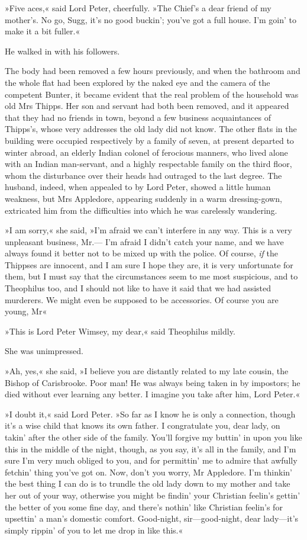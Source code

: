 »Five aces,« said Lord Peter, cheerfully. »The Chief's a dear friend of my mother's. No go, Sugg, it's no good buckin'; you've got a full house. I'm goin' to make it a bit fuller.«

He walked in with his followers.

The body had been removed a few hours previously, and when the bathroom and the whole flat had been explored by the naked eye and the camera of the competent Bunter, it became evident that the real problem of the household was old Mrs Thipps. Her son and servant had both been removed, and it appeared that they had no friends in town, beyond a few business acquaintances of Thipps's, whose very addresses the old lady did not know. The other flats in the building were occupied respectively by a family of seven, at present departed to winter abroad, an elderly Indian colonel of ferocious manners, who lived alone with an Indian man-servant, and a highly respectable family on the third floor, whom the disturbance over their heads had outraged to the last degree. The husband, indeed, when appealed to by Lord Peter, showed a little human weakness, but Mrs Appledore, appearing suddenly in a warm dressing-gown, extricated him from the difficulties into which he was carelessly wandering.

»I am sorry,« she said, »I'm afraid we can't interfere in any way. This is a very unpleasant business, Mr.--- I'm afraid I didn't catch your name, and we have always found it better not to be mixed up with the police. Of course, \textit{if} the Thippses are innocent, and I am sure I hope they are, it is very unfortunate for them, but I must say that the circumstances seem to me most suspicious, and to Theophilus too, and I should not like to have it said that we had assisted murderers. We might even be supposed to be accessories. Of course you are young, Mr\longdash«

»This is Lord Peter Wimsey, my dear,« said Theophilus mildly.

She was unimpressed.

»Ah, yes,« she said, »I believe you are distantly related to my late cousin, the Bishop of Carisbrooke. Poor man! He was always being taken in by impostors; he died without ever learning any better. I imagine you take after him, Lord Peter.«

»I doubt it,« said Lord Peter. »So far as I know he is only a connection, though it's a wise child that knows its own father. I congratulate you, dear lady, on takin' after the other side of the family. You'll forgive my buttin' in upon you like this in the middle of the night, though, as you say, it's all in the family, and I'm sure I'm very much obliged to you, and for permittin' me to admire that awfully fetchin' thing you've got on. Now, don't you worry, Mr Appledore. I'm thinkin' the best thing I can do is to trundle the old lady down to my mother and take her out of your way, otherwise you might be findin' your Christian feelin's gettin' the better of you some fine day, and there's nothin' like Christian feelin's for upsettin' a man's domestic comfort. Good-night, sir\allowbreak---\allowbreak good-night, dear lady\allowbreak---\allowbreak it's simply rippin' of you to let me drop in like this.«

